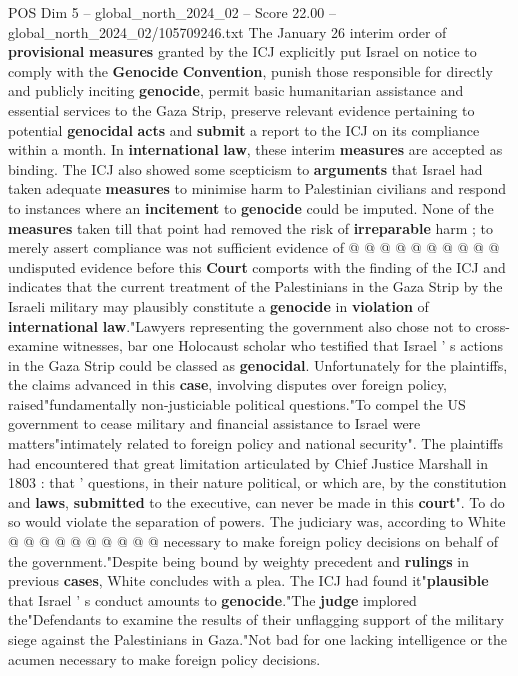 \begin{textsample}{POS Dim 5 – global\_north\_2024\_02 – Score 22.00 – global\_north\_2024\_02/105709246.txt}
The January 26 interim order of \textbf{provisional} \textbf{measures} granted by the ICJ explicitly put Israel on notice to comply with the \textbf{Genocide} \textbf{Convention}, punish those responsible for directly and publicly inciting \textbf{genocide}, permit basic humanitarian assistance and essential services to the Gaza Strip, preserve relevant evidence pertaining to potential \textbf{genocidal} \textbf{acts} and \textbf{submit} a report to the ICJ on its compliance within a month.
In \textbf{international} \textbf{law}, these interim \textbf{measures} are accepted as binding.
The ICJ also showed some scepticism to \textbf{arguments} that Israel had taken adequate \textbf{measures} to minimise harm to Palestinian civilians and respond to instances where an \textbf{incitement} to \textbf{genocide} could be imputed.
None of the \textbf{measures} taken till that point had removed the risk of \textbf{irreparable} harm ; to merely assert compliance was not sufficient evidence of @ @ @ @ @ @ @ @ @ @ undisputed evidence before this \textbf{Court} comports with the finding of the ICJ and indicates that the current treatment of the Palestinians in the Gaza Strip by the Israeli military may plausibly constitute a \textbf{genocide} in \textbf{violation} of \textbf{international} \textbf{law}."Lawyers representing the government also chose not to cross-examine witnesses, bar one Holocaust scholar who testified that Israel ' s actions in the Gaza Strip could be classed as \textbf{genocidal}.
Unfortunately for the plaintiffs, the claims advanced in this \textbf{case}, involving disputes over foreign policy, raised"fundamentally non-justiciable political questions."To compel the US government to cease military and financial assistance to Israel were matters"intimately related to foreign policy and national security".
The plaintiffs had encountered that great limitation articulated by Chief Justice Marshall in 1803 : that ' questions, in their nature political, or which are, by the constitution and \textbf{laws}, \textbf{submitted} to the executive, can never be made in this \textbf{court}".
To do so would violate the separation of powers.
The judiciary was, according to White @ @ @ @ @ @ @ @ @ @ necessary to make foreign policy decisions on behalf of the government."Despite being bound by weighty precedent and \textbf{rulings} in previous \textbf{cases}, White concludes with a plea.
The ICJ had found it"\textbf{plausible} that Israel ' s conduct amounts to \textbf{genocide}."The \textbf{judge} implored the"Defendants to examine the results of their unflagging support of the military siege against the Palestinians in Gaza."Not bad for one lacking intelligence or the acumen necessary to make foreign policy decisions.

\end{textsample}
